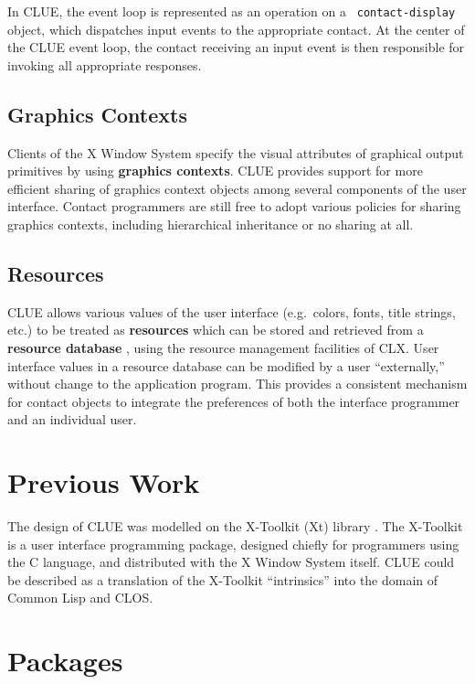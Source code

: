 \documentclass[twoside]{book}
\begin{document}
\begin{sloppy}
In CLUE, the event loop is represented as an operation on a {\tt
contact-display} object, which dispatches input events to the
appropriate contact. At the center of the CLUE event loop,
the contact receiving an input event is then responsible for invoking all
appropriate responses.

\subsection{Graphics Contexts}

Clients of the X Window System specify the visual attributes of
graphical output primitives by using {\bf graphics contexts}. CLUE
provides support for more efficient sharing of graphics context
objects among several components of the user interface. Contact
programmers are still free to adopt various policies for sharing
graphics contexts, including hierarchical inheritance or no sharing at
all.

\subsection{Resources}

CLUE allows various values of the user interface (e.g.\ colors, fonts,
title strings, etc.) to be treated as {\bf resources} which can be
stored and retrieved from a {\bf resource database} , using the resource management facilities of CLX. User
interface values in a resource database can be modified by a user
``externally,'' without change to the application program.  This
provides a consistent mechanism for contact objects to integrate the
preferences of both the interface programmer and an individual user.


\section{Previous Work}

The design of CLUE was modelled on the X-Toolkit (Xt) library
 \cite{Xt}. The X-Toolkit is a user interface
programming package, designed chiefly for programmers using the C
language, and distributed with the X Window System itself. CLUE could
be described as a translation of the X-Toolkit ``intrinsics'' into the
domain of Common Lisp and CLOS.


\section{Packages}


\end{sloppy}
\end{document}

